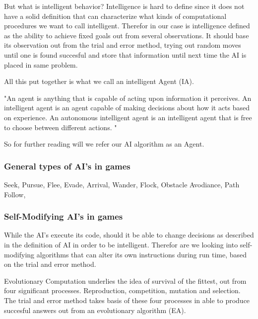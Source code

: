 But what is intelligent behavior? Intelligence is hard to define since it does not have a solid definition that can characterize what kinds of computational procedures we want to call intelligent.
Therefor in our case is intelligence defined as the ability to achieve fixed goals out from several observations.
It should base its observation out from the trial and error method, trying out random moves until one is found succesful and store that information until next time the AI is placed in same problem. 

All this put together is what we call an intelligent Agent (IA).

"An agent is anything that is capable of acting upon information it perceives. An intelligent agent is an agent capable of making decisions about how it acts based on experience. An autonomous intelligent agent is an intelligent agent that is free to choose between different actions. "

So for further reading will we refer our AI algorithm as an Agent.


\subsubsection{General types of AI's in games}

Seek,
Pursue,
Flee,
Evade,
Arrival,
Wander,
Flock,
Obstacle Avodiance,
Path Follow,


\subsubsection{Self-Modifying AI's in games}

While the AI's execute its code, should it be able to change decisions as described in the definition of AI in order to be intelligent. Therefor are we looking into self-modifying algorithms that can alter its own instructions during run time, based on the trial and error method.  

Evolutionary Computation underlies the idea of survival of the fittest, out from four significant processes. 
Reproduction, competition, mutation and selection. \cite{Fogel1997} The trial and error method takes basis of these four processes in able to produce succesful answers out from an evolutionary algorithm (EA). 

